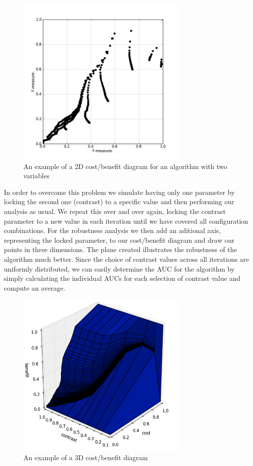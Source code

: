 \documentclass[12pt]{article}
\begin{document}
%
\begin{figure}
     \centering
     \includegraphics[width=0.75\textwidth]{img/2dcostbenefitexample.jpg}
     \caption{An example of a 2D cost/benefit diagram for an algorithm with two variables}
\end{figure}
%
In order to overcome this problem we simulate having only one parameter by locking the second one (contrast) to a specific value and then performing our analysis as usual. We repeat this over and over again, locking the contrast parameter to a new value in each iteration until we have covered all configuration combinations. For the robustness analysis we then add an aditional axis, representing the locked parameter, to our cost/benefit diagram and draw our points in three dimensions. The plane created illustrates the robustness of the algorithm much better. Since the choice of contrast values across all iterations are uniformly distributed, we can easily determine the AUC for the algorithm by simply calculating the individual AUCs for each selection of contrast value and compute an average.
%
\begin{figure}
     \centering
     \includegraphics[width=0.75\textwidth]{img/3dcostbenefitexample.jpg}
     \caption{An example of a 3D cost/benefit diagram}
\end{figure}
%
\end{document}
